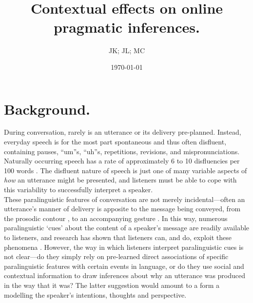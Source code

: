 \documentclass[a4paper,man,natbib]{apa6}
\begin{document}
\title{Contextual effects on online pragmatic inferences.}
\author{JK; JL; MC}
\date{\today}
\maketitle

\section{Background.}
During conversation, rarely is an utterance or its delivery pre-planned.
Instead, everyday speech is for the most part spontaneous and thus often disfluent, containing pauses, ``um''s, ``uh''s, repetitions, revisions, and mispronunciations. 
Naturally occurring speech has a rate of approximately 6 to 10 disfluencies per 100 words \citep{Bortfeld2001, FoxTree1995}.
The disfluent nature of speech is just one of many variable aspects of \textit{how} an utterance might be presented, and listeners must be able to cope with this variability to successfully interpret a speaker.\\

These paralinguistic features of conversation are not merely incidental---often an utterance's manner of delivery is apposite to the message being conveyed, from the prosodic contour \citep{Fernald1991}, to an accompanying gesture \citep{Alibali2001}. 
In this way, numerous paralinguistic `cues' about the content of a speaker's message are readily available to listeners, and research has shown that listeners can, and do, exploit these phenomena \citep{Corley2007, Barr2001, Frazier2006}. 
However, the way in which listeners interpret paralinguistic cues is not clear---do they simply rely on pre-learned direct associations of specific paralinguistic features with certain events in language, or do they use social and contextual information to draw inferences about why an utterance was produced in the way that it was? The latter suggestion would amount to a form a modelling the speaker's intentions, thoughts and perspective.\\
\end{document}
